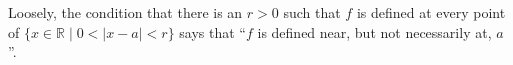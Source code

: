 \documentclass[12pt]{amsart}
\newcommand{\R}{{\mathbb{R}}}
\numberwithin{equation}{section}
\theoremstyle{plain} %
\theoremstyle{definition}
\newtheorem{ex}[equation]{Example}
\theoremstyle{remark}
\begin{document}
 Loosely, the condition that there is an $r > 0$ such that 
$f$ is defined at every point of $\{x \in \R \mid 0 < |x-a| < r\}$ says that ``$f$ is defined near, but not necessarily at, $a$''. 






\end{document}
